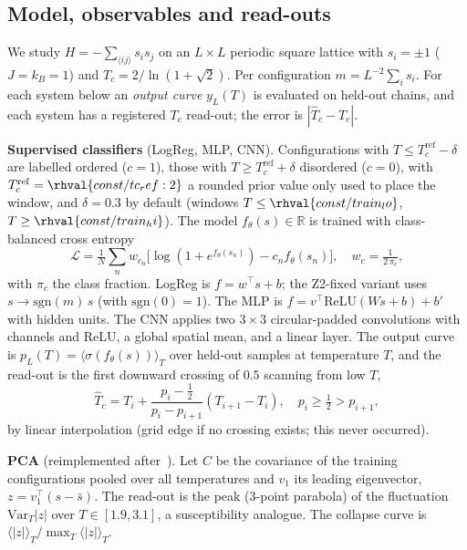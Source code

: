 \subsection{Model, observables and read-outs}
We study $H=-\sum_{\langle ij\rangle}s_is_j$ on an $L\times L$ periodic square lattice with $s_i=\pm1$ ($J=k_B=1$) and $T_c=2/\ln(1+\sqrt2)$. Per configuration $m=L^{-2}\sum_i s_i$. For each system below an \emph{output curve} $y_L(T)$ is evaluated on held-out chains, and each system has a registered $T_c$ read-out; the error is $|\hat T_c-T_c|$.

\textbf{Supervised classifiers} (LogReg, MLP, CNN). Configurations with $T\le T_c^{\mathrm{ref}}-\delta$ are labelled ordered ($c=1$), those with $T\ge T_c^{\mathrm{ref}}+\delta$ disordered ($c=0$), with $T_c^{\mathrm{ref}}=\rhval{const/tc_ref:2}$ a rounded prior value only used to place the window, and $\delta=0.3$ by default (windows $T\le\rhval{const/train_lo}$, $T\ge\rhval{const/train_hi}$). The model $f_\theta(s)\in\mathbb R$ is trained with class-balanced cross entropy
\begin{equation}
\mathcal L=\tfrac1N\sum_n w_{c_n}\big[\log(1+e^{f_\theta(s_n)})-c_nf_\theta(s_n)\big],\quad w_c=\tfrac{1}{2\,\pi_c},
\end{equation}
with $\pi_c$ the class fraction. LogReg is $f=w^\top s+b$; the Z2-fixed variant uses $s\to\mathrm{sgn}(m)\,s$ (with $\mathrm{sgn}(0)=1$). The MLP is $f=v^\top\mathrm{ReLU}(Ws+b)+b'$ with  hidden units. The CNN applies two $3{\times}3$ circular-padded convolutions with  channels and ReLU, a global spatial mean, and a linear layer. The output curve is $p_L(T)=\langle\sigma(f_\theta(s))\rangle_T$ over held-out samples at temperature $T$, and the read-out is the first downward crossing of $0.5$ scanning from low $T$,
\begin{equation}
\hat T_c = T_i+\frac{p_i-\frac12}{p_i-p_{i+1}}(T_{i+1}-T_i),\quad p_i\ge\tfrac12>p_{i+1},
\end{equation}
by linear interpolation (grid edge if no crossing exists; this never occurred).

\textbf{PCA} (reimplemented after~\cite{wang2016discovering}). Let $C$ be the covariance of the training configurations pooled over all temperatures and $v_1$ its leading eigenvector, $z=v_1^\top(s-\bar s)$. The read-out is the peak (3-point parabola) of the fluctuation $\mathrm{Var}_T|z|$ over $T\in[1.9,3.1]$, a susceptibility analogue. The collapse curve is $\langle|z|\rangle_T/\max_T\langle|z|\rangle_T$.

